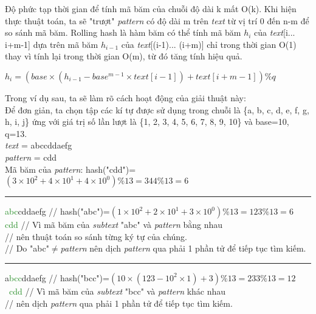 \documentclass[a4paper,11pt]{article}
\begin{document}
			Độ phức tạp thời gian để tính mã băm của chuỗi độ dài k mất O(k). Khi hiện thực thuật toán, ta sẽ "trượt" \textit{pattern} có độ dài m trên \textit{text} từ vị trí 0 đến n-m để so sánh mã băm. Rolling hash là hàm băm có thể tính mã băm $h_i$ của \textit{text}[i... i+m-1] dựa trên mã băm $h_{i-1}$ của \textit{text}[(i-1)... (i+m)] chỉ trong thời gian O(1) thay vì tính lại trong thời gian O(m), từ đó tăng tính hiệu quả.

			$h_i=(base\times(h_{i-1}-base^{m-1}\times\textit{text}[i-1])+\textit{text}[i+m-1]) \% q$

			Trong ví dụ sau, ta sẽ làm rõ cách hoạt động của giải thuật này:\\
			Để đơn giản, ta chọn tập các kí tự được sử dụng trong chuỗi là \{a, b, c, d, e, f, g, h, i, j\} ứng với giá trị số lần lượt là \{1, 2, 3, 4, 5, 6, 7, 8, 9, 10\} và base=10, q=13.\\
			\textit{text} \hspace*{6mm}= abccddaefg\\
			\textit{pattern} \hspace*{0.3mm}= cdd\\
			Mã băm của \textit{pattern}: hash("cdd")=$(3\times10^2+4\times10^1+4\times10^0) \% 13=344 \% 13=6$

			\vspace*{4mm}
			\hrule
			\textcolor{ForestGreen}{abc}cddaefg \hspace*{0.6cm} // hash("abc")=$(1\times10^2+2\times10^1+3\times10^0) \% 13=123 \% 13=6$\\
			\textcolor{ForestGreen}{cdd} \hspace*{1.8cm} // Vì mã băm của \textit{subtext} "abc" và \textit{pattern} bằng nhau \\
		\hspace*{2.5cm} // nên thuật toán so sánh từng ký tự của chúng.\\
		\hspace*{2.5cm} // Do "abc"$\neq$\textit{pattern} nên dịch \textit{pattern} qua phải 1 phần tử để tiếp tục tìm kiếm.

			\vspace*{2mm}
			\hrule
			a\textcolor{ForestGreen}{bcc}ddaefg \hspace*{0.6cm} // hash("bcc")=$(10\times(123-10^2\times1)+3)\%13=233\%13=12$\\
			\textcolor{white}{a}\textcolor{ForestGreen}{cdd} \hspace*{1.6cm} // Vì mã băm của \textit{subtext} "bcc" và \textit{pattern} khác nhau \\
		\hspace*{2.5cm} // nên dịch \textit{pattern} qua phải 1 phần tử để tiếp tục tìm kiếm.
\end{document}
